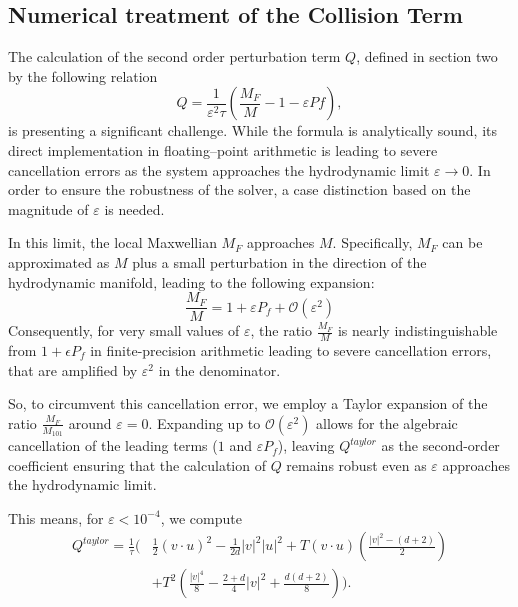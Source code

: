\documentclass[final,11pt]{siamart251216}
\numberwithin{equation}{section}
\theoremstyle{definition}
\theoremstyle{remark}
\begin{document}
\subsection{Numerical treatment of the Collision Term}
The calculation of the second order perturbation term $Q$, defined in section two by the following relation
\[
Q = \frac{1}{\varepsilon^2 \tau} \left( \frac{M_F}{M} - 1 - \varepsilon Pf\right),
\]
is presenting a significant challenge. While the formula is analytically sound, its direct implementation in floating--point arithmetic is leading to severe cancellation errors as the system approaches the hydrodynamic limit $\varepsilon \to 0$. In order to ensure the robustness of the solver, a case distinction based on the magnitude of $\varepsilon$ is needed.

In this limit, the local Maxwellian $M_F$ approaches $M$. 
Specifically, $M_F$ can be approximated as $M$ plus a small perturbation in the direction of the hydrodynamic manifold, leading to the following expansion:
$$\frac{M_F}{M} = 1 + \varepsilon P_f + \mathcal{O}(\varepsilon^2)$$
Consequently, for very small values of $\varepsilon$, the ratio $\frac{M_F}{M}$ is nearly indistinguishable from $1 + \epsilon P_f$ in finite-precision arithmetic leading to severe cancellation errors, that are amplified by $\varepsilon^2$ in the denominator.

So, to circumvent this cancellation error, we employ a Taylor expansion of the ratio $\frac{M_F}{M_{101}}$ around $\varepsilon = 0$. Expanding up to $\mathcal{O}(\varepsilon^2)$ allows for the algebraic cancellation of the leading terms ($1$ and $\varepsilon P_f$), leaving $Q^{taylor}$ as the second-order coefficient ensuring that the calculation of $Q$ remains robust even as $\varepsilon$ approaches the hydrodynamic limit.

This means, for $\varepsilon < 10^{-4}$, we compute
\begin{equation}
\begin{split}
Q^{taylor} = \frac{1}{\tau} \biggl( & \frac{1}{2}(v \cdot u)^2 - \frac{1}{2d}|v|^2 |u|^2 + T(v \cdot u) \left( \frac{|v|^2 - (d+2)}{2} \right) \\
& + T^2 \left( \frac{|v|^4}{8} - \frac{2+d}{4}|v|^2 + \frac{d(d+2)}{8} \right) \biggr).
\end{split}
\end{equation}
\end{document}
